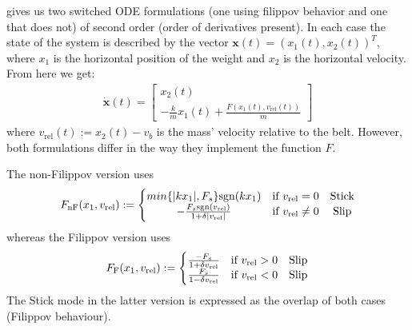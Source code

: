 \noindent
\autocite{meyer2020numerical} gives us two switched ODE formulations (one using filippov behavior and one that does not) of second order (order of derivatives present). In each case the state of the system is described by the vector $\mathbf{x}(t)=(x_1(t), x_2(t))^T$, where $x_1$ is the horizontal position of the weight and $x_2$ is the horizontal velocity. From here we get:
\begin{align}
	\dot{\mathbf{x}}(t)= \begin{bmatrix} x_2(t) \\ -\frac{k}{m}x_1(t) + \frac{F(x_1(t), v_{\text{rel}}(t))}{m} \end{bmatrix}
\end{align}
where $v_{\text{rel}}(t) := x_2(t) - v_b$ is the mass' velocity relative to the belt. However, both formulations differ in the way they implement the function $F$. 

\noindent
The non-Filippov version uses
\begin{align}
	F_{\text{nF}}(x_1, v_{\text{rel}}) := \left\{ \begin{matrix}
		min\{ |kx_1|, F_s \} \text{sgn}(kx_1) & \text{if } v_{\text{rel}} = 0 & \text{Stick} \\
		-\frac{F_s\text{sgn}(v_{\text{rel}})}{1+\delta|v_{\text{rel}}|} & \text{if } v_{\text{rel}} \neq 0 & \text{Slip}
	\end{matrix} \right. \label{eq:F1}
\end{align}
whereas the Filippov version uses
\begin{align}
	F_{\text{F}}(x_1, v_{\text{rel}}) := \left\{ \begin{matrix}
		\frac{-F_s}{1+\delta v_{\text{rel}}} & \text{if } v_{\text{rel}} > 0 & \text{Slip} \\
		\frac{F_s}{1-\delta v_{\text{rel}}} & \text{if } v_{\text{rel}} < 0 & \text{Slip}
	\end{matrix} \right. \label{eq:F2}
\end{align}
The Stick mode in the latter version is expressed as the overlap of both cases (Filippov behaviour).


